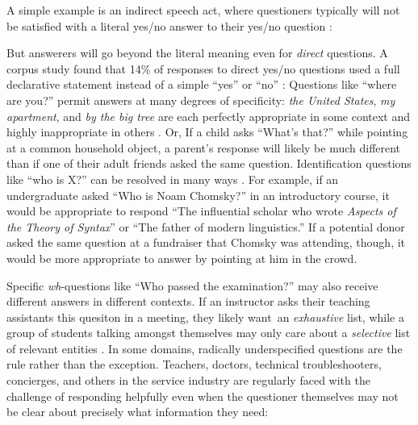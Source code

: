 \documentclass[11pt, floatsintext]{apa6}
\begin{document}
A simple example is an indirect speech act, where questioners typically will not be satisfied with a literal yes/no answer to their yes/no question \cite{Clark79_IndirectSpeechActs}:  
 
But answerers will go beyond the literal meaning even for \emph{direct} questions. 
A corpus study found that 14\% of responses to direct yes/no questions used a full declarative statement instead of a simple ``yes'' or ``no'' \cite{DeMarneffeGrimmPotts09_IndirectAnswersCorpus}:
Questions like ``where are you?'' permit answers at many degrees of specificity: \emph{the United States}, \emph{my apartment}, and \emph{by the big tree} are each perfectly appropriate in some context and highly inappropriate in others \cite{Potts12_CardsDialogueCorpus}. 
Or, If a child asks ``What's that?'' while pointing at a common household object, a parent's response will likely be much different than if one of their adult friends asked the same question. 
Identification questions like ``who is X?'' can be resolved in many ways  \cite{BoerLycan75_KnowingWho, Gerbrandy00_Identity, Aloni05_ConceptualCovers}. 
For example, if an undergraduate asked ``Who is Noam Chomsky?'' in an introductory course, it would be appropriate to respond ``The influential scholar who wrote \emph{Aspects of the Theory of Syntax}'' or ``The father of modern linguistics.'' 
If a potential donor asked the same question at a fundraiser that Chomsky was attending, though, it would be more appropriate to answer by pointing at him in the crowd. 

Specific \emph{wh}-questions like ``Who passed the examination?'' may also receive different answers in different contexts. 
If an instructor asks their teaching assistants this quesiton in a meeting, they likely want an \emph{exhaustive} list, while a group of students talking amongst themselves may only care about a \emph{selective} list of relevant entities \cite{SchulzVanRooij06_ExhaustiveInterpretation}.
In some domains, radically underspecified questions are the rule rather than the exception. 
Teachers, doctors, technical troubleshooters, concierges, and others in the service industry are regularly faced with the challenge of responding helpfully even when the questioner themselves may not be clear about precisely what information they need:
\end{document}
